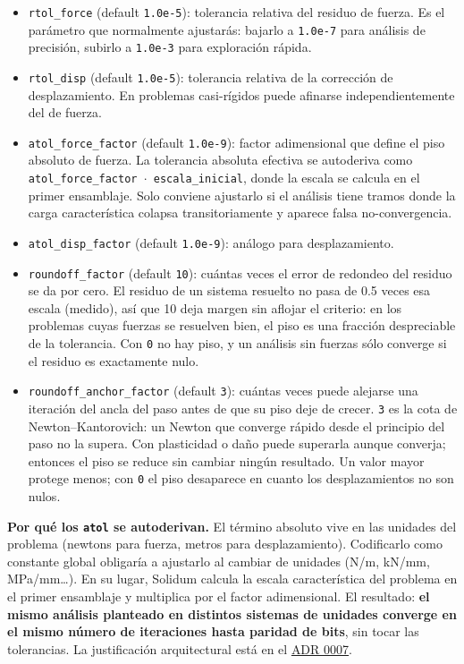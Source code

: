 \documentclass[11pt,oneside]{report}
\begin{document}
\begin{itemize}
  \item \texttt{rtol\_force} (default \texttt{1.0e-5}): tolerancia relativa del residuo de fuerza. Es el parámetro que normalmente ajustarás: bajarlo a \texttt{1.0e-7} para análisis de precisión, subirlo a \texttt{1.0e-3} para exploración rápida.
  \item \texttt{rtol\_disp} (default \texttt{1.0e-5}): tolerancia relativa de la corrección de desplazamiento. En problemas casi-rígidos puede afinarse independientemente del de fuerza.
  \item \texttt{atol\_\allowbreak{}force\_\allowbreak{}factor} (default \texttt{1.0e-9}): factor adimensional que define el piso absoluto de fuerza. La tolerancia absoluta efectiva se autoderiva como \texttt{atol\_\allowbreak{}force\_\allowbreak{}factor \ensuremath{\cdot} escala\_\allowbreak{}inicial}, donde la escala se calcula en el primer ensamblaje. Solo conviene ajustarlo si el análisis tiene tramos donde la carga característica colapsa transitoriamente y aparece falsa no-convergencia.
  \item \texttt{atol\_disp\_factor} (default \texttt{1.0e-9}): análogo para desplazamiento.
  \item \texttt{roundoff\_factor} (default \texttt{10}): cuántas veces el error de redondeo del residuo se da por cero. El residuo de un sistema resuelto no pasa de 0.5 veces esa escala (medido), así que 10 deja margen sin aflojar el criterio: en los problemas cuyas fuerzas se resuelven bien, el piso es una fracción despreciable de la tolerancia. Con \texttt{0} no hay piso, y un análisis sin fuerzas sólo converge si el residuo es exactamente nulo.
  \item \texttt{roundoff\_\allowbreak{}anchor\_\allowbreak{}factor} (default \texttt{3}): cuántas veces puede alejarse una iteración del ancla del paso antes de que su piso deje de crecer. \texttt{3} es la cota de Newton--Kantorovich: un Newton que converge rápido desde el principio del paso no la supera. Con plasticidad o daño puede superarla aunque converja; entonces el piso se reduce sin cambiar ningún resultado. Un valor mayor protege menos; con \texttt{0} el piso desaparece en cuanto los desplazamientos no son nulos.
\end{itemize}

\textbf{Por qué los \texttt{atol} se autoderivan.} El término absoluto vive en las unidades del problema (newtons para fuerza, metros para desplazamiento). Codificarlo como constante global obligaría a ajustarlo al cambiar de unidades (N/m, kN/mm, MPa/mm\ldots{}). En su lugar, Solidum calcula la escala característica del problema en el primer ensamblaje y multiplica por el factor adimensional. El resultado: \textbf{el mismo análisis planteado en distintos sistemas de unidades converge en el mismo número de iteraciones hasta paridad de bits}, sin tocar las tolerancias. La justificación arquitectural está en el \href{https://github.com/jretamav/solidum-fem/blob/main/docs/adr/0007-tolerancias-convergencia-solvers.md}{ADR 0007}.
\end{document}
